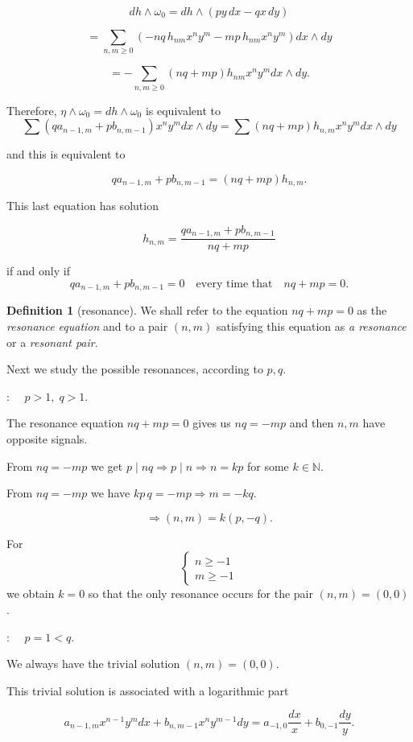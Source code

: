 \documentclass[11pt,a4paper]{amsart}
\theoremstyle{definition}
\newtheorem{definition}[theorem]{Definition}
\begin{document}
\[
dh \wedge \omega_0
=
dh \wedge (p y\,dx - q x\,dy)
\]

\[
=
\sum_{n,m\ge0}
(-nq\, h_{nm} x^n y^m
-
mp\, h_{nm} x^n y^m) dx\wedge dy
\]

\[
=
-
\sum_{n,m\ge0}
(nq + mp) h_{nm} x^n y^m dx\wedge dy .
\]

Therefore, $\eta \wedge \omega_0 = dh \wedge \omega_0$ is equivalent to
\[
\sum (q a_{n-1,m} + p b_{n,m-1}) x^n y^m dx\wedge dy
=
\sum (nq+mp) h_{n,m} x^n y^m dx\wedge dy
\]

and this is equivalent to

\[
q a_{n-1,m} + p b_{n,m-1} = (nq+mp) h_{n,m}.
\]

This last equation has solution

\[
h_{n,m} = \frac{q a_{n-1,m} + p b_{n,m-1}}{nq+mp}
\]

if and only if
\[
q a_{n-1,m} + p b_{n,m-1} = 0
\quad \text{every time that} \quad
nq+mp=0.
\]

\begin{definition}[resonance] We shall refer to the equation $nq+mp=0$ as the {\it resonance equation}
and to a pair $(n,m)$ satisfying this equation as {\it a resonance}  or a {\it resonant pair}.
\end{definition}

Next we study the possible resonances, according to $p,q$.


 : $\quad p>1,\; q>1.$

The resonance equation $nq+mp=0$ gives us $nq=-mp$ and then $n,m$ have opposite
signals.

From $nq=-mp$ we get $p \mid nq \Rightarrow p \mid n \Rightarrow n=kp$ for some $k\in\mathbb{N}$.

From $nq=-mp$ we have $kp\,q=-mp \Rightarrow m=-kq$.

\[
\Rightarrow (n,m)=k(p,-q).
\]

For
\[
\begin{cases}
n\ge -1\\
m\ge -1
\end{cases}
\]
we obtain $k=0$ so that the only resonance occurs for the pair $(n,m)=(0,0)$.


 : $\quad p=1<q.$

We always have the trivial solution $(n,m)=(0,0)$.

This trivial solution is associated with a logarithmic part

\[
a_{n-1,m} x^{n-1}y^m dx + b_{n,m-1} x^n y^{m-1} dy
=
a_{-1,0}\frac{dx}{x} + b_{0,-1}\frac{dy}{y}.
\]
\end{document}

